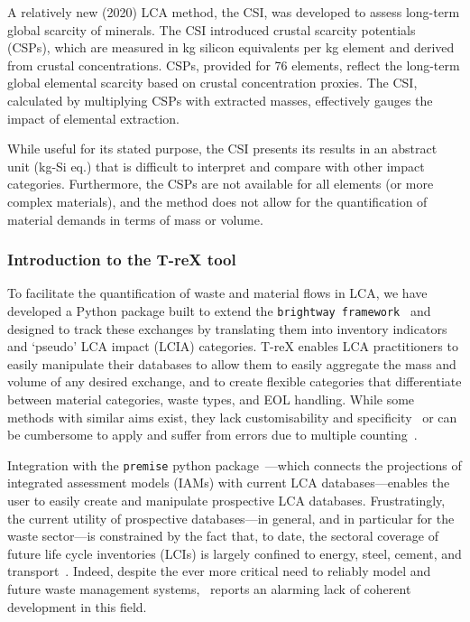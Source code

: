 A relatively new (2020) LCA method, the CSI, was developed to assess long-term global scarcity of minerals. The CSI introduced crustal scarcity potentials (CSPs), which are measured in kg silicon equivalents per kg element and derived from crustal concentrations. CSPs, provided for 76 elements, reflect the long-term global elemental scarcity based on crustal concentration proxies. The CSI, calculated by multiplying CSPs with extracted masses, effectively gauges the impact of elemental extraction. 

While useful for its stated purpose, the CSI presents its results in an abstract unit (kg-Si eq.) that is difficult to interpret and compare with other impact categories. Furthermore, the CSPs are not available for all elements (or more complex materials), and the method does not allow for the quantification of material demands in terms of mass or volume.

\subsubsection{Introduction to the T-reX tool}

To facilitate the quantification of waste and material flows in LCA, we have developed a Python package built to extend the \texttt{brightway framework}~\citep{mutel2017brightway} and designed to track these exchanges by translating them into inventory indicators and `pseudo' LCA impact (LCIA) categories. T-reX enables LCA practitioners to easily manipulate their databases to allow them to easily aggregate the mass and volume of any desired exchange, and to create flexible categories that differentiate between material categories, waste types, and EOL handling. While some methods with similar aims exist, they lack customisability and specificity~\citep{foen2021ecofactors} or can be cumbersome to apply and suffer from errors due to multiple counting~\citep{laurenti2023wastefootprint}.


Integration with the \texttt{premise} python package~\citep{sacchi2022premise}---which connects the projections of integrated assessment models (IAMs) with current LCA databases---enables the user to easily create and manipulate prospective LCA databases. Frustratingly, the current utility of prospective databases---in general, and in particular for the waste sector---is constrained by the fact that, to date, the sectoral coverage of future life cycle inventories (LCIs) is largely confined to energy, steel, cement, and transport~\citep{sacchi2023premisedocs}. Indeed, despite the ever more critical need to reliably model and future waste management systems,~\cite{bisinella2024wastelca} reports an alarming lack of coherent development in this field. 


